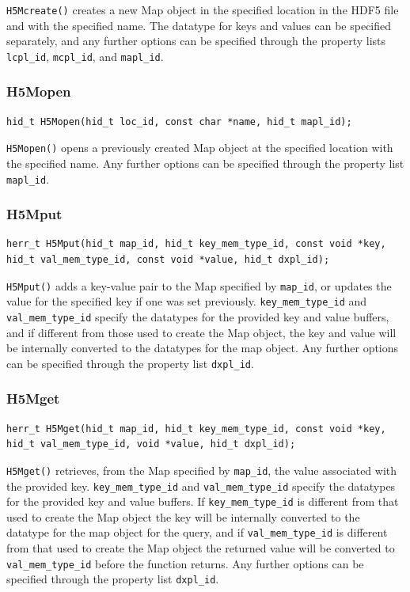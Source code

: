 \verb+H5Mcreate()+ creates a new Map object in the specified location in the HDF5 file and with the specified name. The datatype for keys and values can be specified separately, and any further options can be specified through the property lists \verb+lcpl_id+, \verb+mcpl_id+, and \verb+mapl_id+.


\subsubsection{H5Mopen}

{
\begin{lstlisting}
hid_t H5Mopen(hid_t loc_id, const char *name, hid_t mapl_id);
\end{lstlisting}
}

\verb+H5Mopen()+ opens a previously created Map object at the specified location with the specified name. Any further options can be specified through the property list \verb+mapl_id+.

\subsubsection{H5Mput}

{
\begin{lstlisting}
herr_t H5Mput(hid_t map_id, hid_t key_mem_type_id, const void *key, hid_t val_mem_type_id, const void *value, hid_t dxpl_id);
\end{lstlisting}
}

\verb+H5Mput()+ adds a key-value pair to the Map specified by \verb+map_id+, or updates the value for the specified key if one was set previously. \verb+key_mem_type_id+ and \verb+val_mem_type_id+ specify the datatypes for the provided key and value buffers, and if different from those used to create the Map object, the key and value will be internally converted to the datatypes for the map object. Any further options can be specified through the property list \verb+dxpl_id+.

\subsubsection{H5Mget}

{
\begin{lstlisting}
herr_t H5Mget(hid_t map_id, hid_t key_mem_type_id, const void *key, hid_t val_mem_type_id, void *value, hid_t dxpl_id);
\end{lstlisting}
}

\verb+H5Mget()+ retrieves, from the Map specified by \verb+map_id+, the value associated with the provided key. \verb+key_mem_type_id+ and \verb+val_mem_type_id+ specify the datatypes for the provided key and value buffers. If \verb+key_mem_type_id+ is different from that used to create the Map object the key will be internally converted to the datatype for the map object for the query, and if \verb+val_mem_type_id+ is different from that used to create the Map object the returned value will be converted to \verb+val_mem_type_id+ before the function returns. Any further options can be specified through the property list \verb+dxpl_id+.

